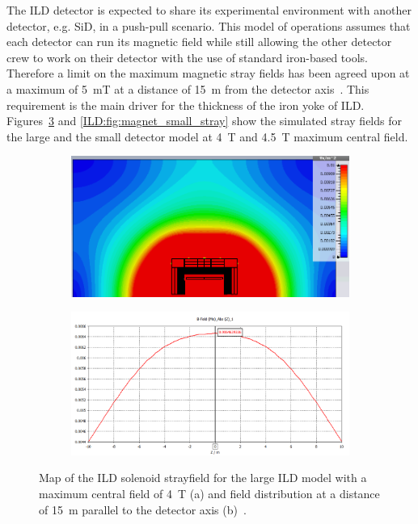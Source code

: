 The ILD detector is expected to share its experimental environment with another detector, e.g. SiD, in a push-pull scenario. This model of operations assumes that each detector can run its magnetic field while still allowing the other detector crew to work on their detector with the use of standard iron-based tools. Therefore a limit on the maximum magnetic stray fields has been agreed upon at a maximum of 5~mT at a distance of 15~m from the detector axis~\cite{Parker:2009zz}. This requirement is the main driver for the thickness of the iron yoke of ILD. Figures~\ref{ILD:fig:magnet_nominal_stray} and \ref{ILD:fig:magnet_small_stray} show the simulated stray fields for the large and the small detector model at 4~T and 4.5~T maximum central field.
\begin{figure}[t]
\begin{center}
\begin{subfigure}{0.9\hsize} \includegraphics[width=\textwidth]{Integration/fig/strayfield_nominal_4.png}
\caption{ \label{ild:fig:magnet_nominal_stray_map}}
 \end{subfigure}
\hspace{0.03\textwidth}
\begin{subfigure}{0.9\hsize} \includegraphics[width=\textwidth]{Integration/fig/strayfield_nominal_4_plot.png}
\caption{  \label{ild:fig:magnet_nominal_stray_field}}
 \end{subfigure}
\end{center}
\caption{Map of the ILD solenoid strayfield for the large ILD model with a maximum central field of 4~T (a) and field distribution at a distance of 15~m parallel to the detector axis (b)~\cite{ild:bib:Magnet_Simulations}.}
\label{ILD:fig:magnet_nominal_stray}
\end{figure}

